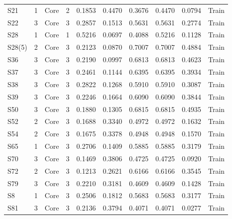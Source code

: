 \begin{table}[htbp]
\begin{tabular}{lrrrrrrrrr}
    S21 & 1 & Core & 2 & 0.1853 & 0.4470 & 0.3676 & 0.4470 & 0.0794 & Train \\
    S22 & 3 & Core & 3 & 0.2857 & 0.1513 & 0.5631 & 0.5631 & 0.2774 & Train \\
    S28 & 1 & Core & 1 & 0.5216 & 0.0697 & 0.4088 & 0.5216 & 0.1128 & Train \\
    S28(5) & 2 & Core & 3 & 0.2123 & 0.0870 & 0.7007 & 0.7007 & 0.4884 & Train \\
    S36 & 3 & Core & 3 & 0.2190 & 0.0997 & 0.6813 & 0.6813 & 0.4623 & Train \\
    S37 & 3 & Core & 3 & 0.2461 & 0.1144 & 0.6395 & 0.6395 & 0.3934 & Train \\
    S38 & 3 & Core & 3 & 0.2822 & 0.1268 & 0.5910 & 0.5910 & 0.3087 & Train \\
    S39 & 3 & Core & 3 & 0.2246 & 0.1664 & 0.6090 & 0.6090 & 0.3844 & Train \\
    S50 & 3 & Core & 3 & 0.1880 & 0.1305 & 0.6815 & 0.6815 & 0.4935 & Train \\
    S52 & 2 & Core & 3 & 0.1688 & 0.3340 & 0.4972 & 0.4972 & 0.1632 & Train \\
    S54 & 2 & Core & 3 & 0.1675 & 0.3378 & 0.4948 & 0.4948 & 0.1570 & Train \\
    S65 & 1 & Core & 3 & 0.2706 & 0.1409 & 0.5885 & 0.5885 & 0.3179 & Train \\
    S70 & 3 & Core & 3 & 0.1469 & 0.3806 & 0.4725 & 0.4725 & 0.0920 & Train \\
    S72 & 2 & Core & 3 & 0.1213 & 0.2621 & 0.6166 & 0.6166 & 0.3545 & Train \\
    S79 & 3 & Core & 3 & 0.2210 & 0.3181 & 0.4609 & 0.4609 & 0.1428 & Train \\
    S8 & 1 & Core & 3 & 0.2506 & 0.1812 & 0.5683 & 0.5683 & 0.3177 & Train \\
    S81 & 3 & Core & 3 & 0.2136 & 0.3794 & 0.4071 & 0.4071 & 0.0277 & Train \\
    \bottomrule
  \end{tabular}
\end{table}
